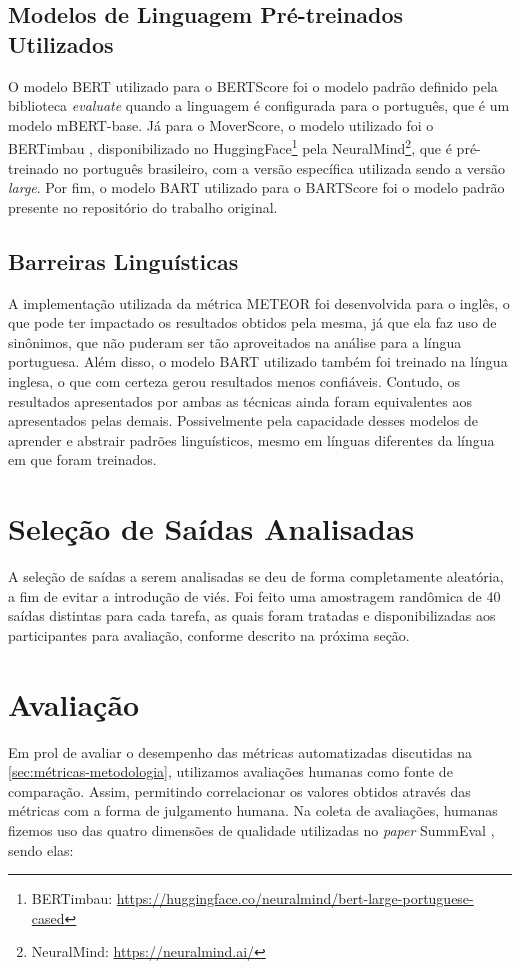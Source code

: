 \documentclass[cic,tc]{iiufrgs}
\begin{document}
\subsection{Modelos de Linguagem Pré-treinados Utilizados}
O modelo BERT \cite{devlin2019bert} utilizado para o BERTScore foi o modelo padrão definido pela biblioteca \textit{evaluate} quando a linguagem é configurada para o português, que é um modelo mBERT-base. Já para o MoverScore, o modelo utilizado foi o BERTimbau \cite{souza2020bertimbau}, disponibilizado no HuggingFace\footnote{BERTimbau: \url{https://huggingface.co/neuralmind/bert-large-portuguese-cased}} pela NeuralMind\footnote{NeuralMind: \url{https://neuralmind.ai/}}, que é pré-treinado no português brasileiro, com a versão específica utilizada sendo a versão \textit{large}. Por fim, o modelo BART \cite{lewis2019bart} utilizado para o BARTScore foi o modelo padrão presente no repositório do trabalho original. 

\subsection{Barreiras Linguísticas}
A implementação utilizada da métrica METEOR foi desenvolvida para o inglês, o que pode ter impactado os resultados obtidos pela mesma, já que ela faz uso de sinônimos, que não puderam ser tão aproveitados na análise para a língua portuguesa. Além disso, o modelo BART utilizado também foi treinado na língua inglesa, o que com certeza gerou resultados menos confiáveis. Contudo, os resultados apresentados por ambas as técnicas ainda foram equivalentes aos apresentados pelas demais. Possivelmente pela capacidade desses modelos de aprender e abstrair padrões linguísticos, mesmo em línguas diferentes da língua em que foram treinados.


\section{Seleção de Saídas Analisadas}
A seleção de saídas a serem analisadas se deu de forma completamente aleatória, a fim de evitar a introdução de viés. Foi feito uma amostragem randômica de 40 saídas distintas para cada tarefa, as quais foram tratadas e disponibilizadas aos participantes para avaliação, conforme descrito na próxima seção.

\section{Avaliação}
\label{sec:avaliacao-humana}
Em prol de avaliar o desempenho das métricas automatizadas discutidas na \autoref{sec:métricas-metodologia}, utilizamos avaliações humanas como fonte de comparação. Assim, permitindo correlacionar os valores obtidos através das métricas com a forma de julgamento humana. Na coleta de avaliações, humanas fizemos uso das quatro dimensões de qualidade utilizadas no \textit{paper} SummEval \cite{fabbri2021summeval}, sendo elas:
\end{document}
